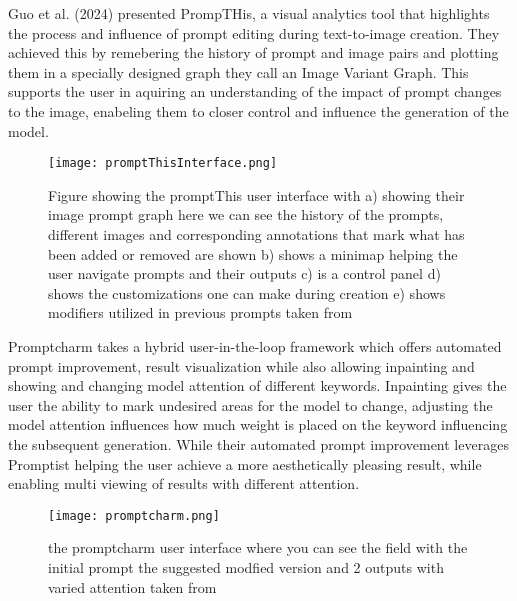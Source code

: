 \documentclass[
  a4paper,  %
  twoside,  %
  bibliography=totoc,
  headsepline,
  cleardoublepage=empty,
  parskip=half,
  draft=false
]{scrbook}
\begin{document}
 Guo et al. (2024) \cite{guo2024prompthisvisualizingprocessinfluence} presented PrompTHis, a visual analytics tool that highlights the process and influence of prompt editing during text-to-image creation. They achieved this by remebering the history of prompt and image pairs and plotting them in a specially designed graph they call an Image Variant Graph. This supports the user in aquiring an understanding of the impact of prompt changes to the image, enabeling them to closer control and influence the generation of the model.\\
 
  \begin{figure}[H]
 	\centering
 	\texttt{[image: promptThisInterface.png]}
 	\caption{ Figure showing the promptThis user interface with a) showing their image prompt graph here we can see the history of the prompts, different images and corresponding annotations that mark what has been added or removed are shown b) shows a minimap helping the user navigate prompts and their outputs c) is a control panel  d) shows the customizations one can make during creation e) shows modifiers utilized in previous prompts taken from \cite{guo2024prompthisvisualizingprocessinfluence}}
 	\label{fig:promptThis}
 \end{figure}
 
 
 
 
 
 Promptcharm \cite{promptCharm} takes a hybrid user-in-the-loop framework which offers automated prompt improvement, result visualization while also allowing inpainting and showing and changing model attention of different keywords. Inpainting gives the user the ability to mark undesired areas for the model to change, adjusting the model attention influences how much weight is placed on the keyword influencing the subsequent generation. While their automated prompt improvement leverages Promptist \cite{hao2023optimizingpromptstexttoimagegeneration} helping the user achieve a more aesthetically pleasing result, while enabling multi viewing of results with different attention.  
 
 \begin{figure}[H]
 	\centering
 	\texttt{[image: promptcharm.png]}
 	\caption{the promptcharm user interface where you can see the field with the initial prompt the suggested modfied version and 2 outputs with varied attention taken from \cite{promptCharm}}
 	\label{fig:promptCharm}
 \end{figure}
 
\end{document}
